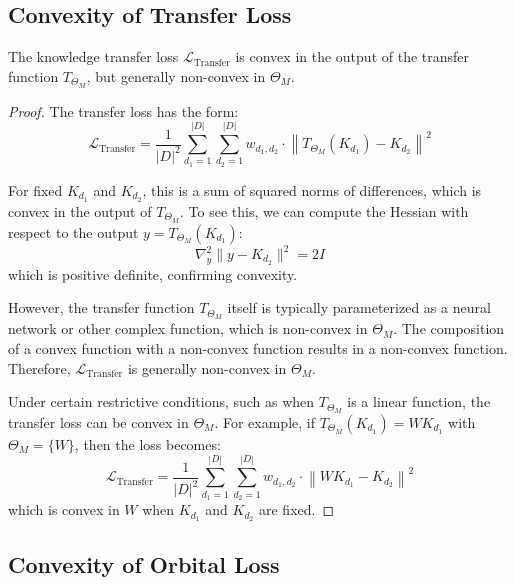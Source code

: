 \subsection{Convexity of Transfer Loss}

\begin{theorem}
The knowledge transfer loss $\mathcal{L}_{\text{Transfer}}$ is convex in the output of the transfer function $T_{\Theta_M}$, but generally non-convex in $\Theta_M$.
\end{theorem}

\begin{proof}
The transfer loss has the form:
\begin{equation}
\mathcal{L}_{\text{Transfer}} = \frac{1}{|D|^2}\sum_{d_1=1}^{|D|} \sum_{d_2=1}^{|D|} w_{d_1,d_2} \cdot \left\|T_{\Theta_M}(K_{d_1}) - K_{d_2}\right\|^2
\end{equation}

For fixed $K_{d_1}$ and $K_{d_2}$, this is a sum of squared norms of differences, which is convex in the output of $T_{\Theta_M}$. To see this, we can compute the Hessian with respect to the output $y = T_{\Theta_M}(K_{d_1})$:
\begin{equation}
\nabla_y^2 \|y - K_{d_2}\|^2 = 2I
\end{equation}
which is positive definite, confirming convexity.

However, the transfer function $T_{\Theta_M}$ itself is typically parameterized as a neural network or other complex function, which is non-convex in $\Theta_M$. The composition of a convex function with a non-convex function results in a non-convex function. Therefore, $\mathcal{L}_{\text{Transfer}}$ is generally non-convex in $\Theta_M$.

Under certain restrictive conditions, such as when $T_{\Theta_M}$ is a linear function, the transfer loss can be convex in $\Theta_M$. For example, if $T_{\Theta_M}(K_{d_1}) = W K_{d_1}$ with $\Theta_M = \{W\}$, then the loss becomes:
\begin{equation}
\mathcal{L}_{\text{Transfer}} = \frac{1}{|D|^2}\sum_{d_1=1}^{|D|} \sum_{d_2=1}^{|D|} w_{d_1,d_2} \cdot \left\|W K_{d_1} - K_{d_2}\right\|^2
\end{equation}
which is convex in $W$ when $K_{d_1}$ and $K_{d_2}$ are fixed.
\end{proof}

\subsection{Convexity of Orbital Loss}

